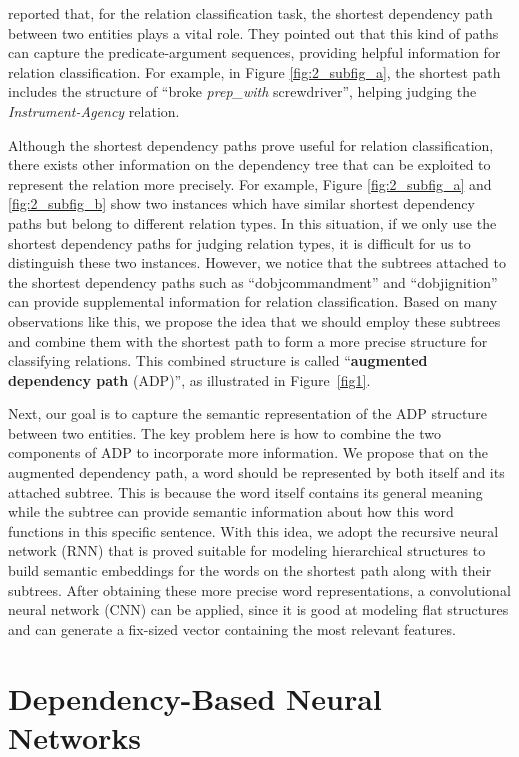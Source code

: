 \documentclass[11pt]{article}
\begin{document}
 reported that, for the relation classification task,  the shortest dependency path between two entities plays a vital role. They pointed out that this kind of paths can capture the predicate-argument sequences, providing helpful information for relation classification. For example, in Figure \ref{fig:2_subfig_a}, the shortest path includes the structure of ``broke \textit{prep\_with} screwdriver'', helping judging the \textit{Instrument-Agency} relation.


Although the shortest dependency paths prove useful for relation classification, there exists other information on the dependency tree that can be exploited to represent the relation  more precisely.
For example, Figure \ref{fig:2_subfig_a} and \ref{fig:2_subfig_b} show two instances which have similar shortest dependency paths but belong to different relation types.
In this situation, if we only use the shortest dependency paths for judging relation types, it is difficult for us to distinguish these two instances.
However, we notice that the  subtrees attached to the shortest dependency paths such as  ``dobjcommandment'' and ``dobjignition'' can provide supplemental information for relation classification.
Based on many observations like this, we propose the idea that we should employ these subtrees and combine them
with the shortest  path to form a more precise structure for classifying  relations.
 This combined structure is called ``\textbf{augmented dependency path} (ADP)'', as illustrated in Figure~\ref{fig1}.


Next, our goal is to capture the semantic representation of the ADP structure between two entities.
The key problem here is how to combine the two components of ADP to incorporate more information.  We propose that on the augmented dependency path, a word should be represented by both itself and its attached subtree.
This is because the word itself contains its general  meaning while the subtree can provide semantic information about how this word functions in this specific sentence.
With this idea, we adopt the recursive neural network (RNN) that is proved suitable for modeling hierarchical structures to build semantic embeddings for the words on the shortest path along with their subtrees.
After obtaining these more precise word representations, a convolutional neural network (CNN) can be applied, since it is good at modeling flat structures and can generate a fix-sized vector containing the most relevant features.

\section{Dependency-Based Neural Networks}
\end{document}
